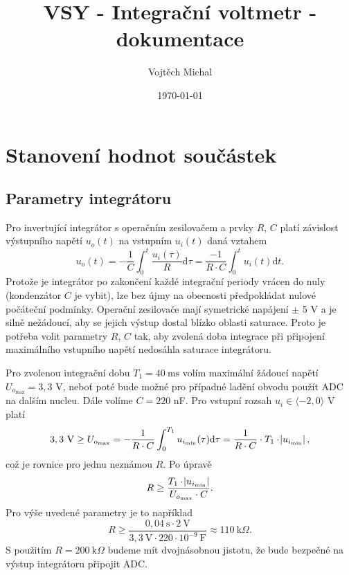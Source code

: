 \documentclass[twoside]{article}
\title{VSY - Integrační voltmetr - dokumentace}
\author{Vojtěch Michal}
\date{\today}
\begin{document}
\maketitle

\section{Stanovení hodnot součástek}

\subsection{Parametry integrátoru}

Pro invertující integrátor s operačním zesilovačem a prvky $R$, $C$ platí závislost výstupního napětí 
$u_o(t)$ na vstupním $u_i(t)$ daná vztahem
\begin{equation}
    u_o(t) = - \frac{1}{C} \int_0^t \frac{u_i(\tau)}{R} \text{d}\tau = \frac{-1}{R\cdot C} \int_0^t u_i(t) \text{d}t.
\end{equation}
Protože je integrátor po zakončení každé integrační periody vrácen do nuly (kondenzátor $C$ je vybit), lze
bez újmy na obecnosti předpokládat nulové počáteční podmínky. Operační zesilovače mají symetrické napájení $\pm$ 5 V 
a je silně nežádoucí, aby se jejich výstup dostal blízko oblasti saturace. Proto je potřeba volit parametry $R$, $C$ tak,
aby zvolená doba integrace při připojení maximálního vstupního napětí nedosáhla saturace integrátoru.

Pro zvolenou integrační dobu $T_1 = 40~\text{ms}$ volím maximální žádoucí napětí $U_{o_\text{max}} = 3,3$ V, neboť poté bude možné 
pro případné ladění obvodu použít ADC na dalším nucleu. Dále volíme $C = 220$ nF. Pro vstupní rozsah $u_i \in \langle -2, 0 \rangle$ V platí
\begin{equation}
    3,3~\text{V} \ge U_{o_\text{max}} = - \frac{1}{R \cdot C} \int_0^{T_1} u_{i_\text{min}}(\tau) \text{d} \tau = \frac{1}{R \cdot C} \cdot T_1 \cdot \abs{u_{i_\text{min}}},
\end{equation}
což je rovnice pro jednu neznámou $R$. Po úpravě
\begin{equation}
    R \ge \frac{T_1 \cdot \abs{u_{i_\text{min}}}}{U_{o_\text{max}} \cdot C}.
\end{equation}
Pro výše uvedené parametry je to například
\begin{equation}
    R \ge \frac{0,04~\text{s} \cdot 2~\text{V}}{3,3~\text{V} \cdot 220 \cdot 10^{-9}~\text{F}} \approx 110~\text{k}\Omega.
\end{equation}
S použitím $R = 200~\text{k}\Omega$ budeme mít dvojnásobnou jistotu, že bude bezpečné na výstup integrátoru připojit ADC.
\end{document}
